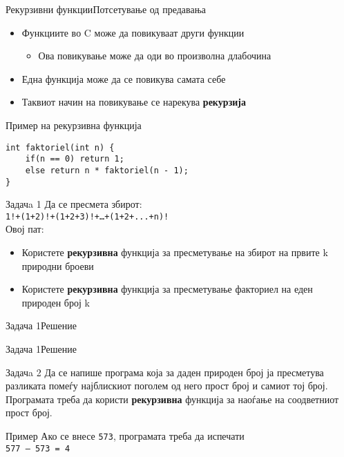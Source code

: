


\begin{frame}[fragile]{Рекурзивни функции}{Потсетување од предавања}
\begin{itemize}
    \item Функциите во C може да повикуваат други функции
    \begin{itemize}
        \item Ова повикување може да оди во произволна длабочина
    \end{itemize}    
    \item Една функција може да се повикува самата себе
    \item Таквиот начин на повикување се нарекува \textbf{рекурзија}    
\end{itemize}
\begin{exampleblock}{Пример на рекурзивна функција}
\begin{lstlisting}
int faktoriel(int n) {
    if(n == 0) return 1;
    else return n * faktoriel(n - 1);
}
\end{lstlisting}
\end{exampleblock}
\end{frame}

\begin{frame}{Задачa 1}
Да се пресмета збирот:\\
\texttt{1!+(1+2)!+(1+2+3)!+\ldots+(1+2+...+n)!}
\\Овој пат:\\
\begin{itemize}
    \item Користете \textbf{рекурзивна} функција за пресметување на збирот на првите k
    природни броеви
    \item Користете \textbf{рекурзивна} функција за пресметување факториел на еден
    природен број k
\end{itemize}
\end{frame}

\begin{frame}[fragile]{Задача 1}{Решение}

\end{frame}

\begin{frame}[fragile]{Задача 1}{Решение}

\end{frame}


\begin{frame}{Задачa 2}
Да се напише програма која за даден природен број ја пресметува разликата помеѓу
најблискиот поголем од него прост број и самиот тој број. Програмата треба да
користи \textbf{рекурзивна} функција за наоѓање на соодветниот прост број.
\begin{exampleblock}{Пример}
Ако се внесе \texttt{573}, програмата треба да испечати\\
\texttt{577 – 573 = 4}
\end{exampleblock}
\end{frame}

